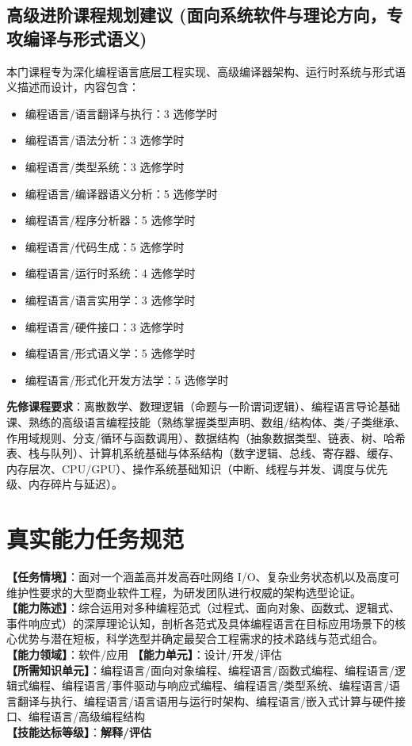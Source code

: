 \subsection{高级进阶课程规划建议 (面向系统软件与理论方向，专攻编译与形式语义)}
本门课程专为深化编程语言底层工程实现、高级编译器架构、运行时系统与形式语义描述而设计，内容包含：
\begin{itemize}
    \item 编程语言/语言翻译与执行：3 选修学时
    \item 编程语言/语法分析：3 选修学时
    \item 编程语言/类型系统：3 选修学时
    \item 编程语言/编译器语义分析：5 选修学时
    \item 编程语言/程序分析器：5 选修学时
    \item 编程语言/代码生成：5 选修学时
    \item 编程语言/运行时系统：4 选修学时
    \item 编程语言/语言实用学：3 选修学时
    \item 编程语言/硬件接口：3 选修学时
    \item 编程语言/形式语义学：5 选修学时
    \item 编程语言/形式化开发方法学：5 选修学时
\end{itemize}
\textbf{先修课程要求}：离散数学、数理逻辑（命题与一阶谓词逻辑）、编程语言导论基础课、熟练的高级语言编程技能（熟练掌握类型声明、数组/结构体、类/子类继承、作用域规则、分支/循环与函数调用）、数据结构（抽象数据类型、链表、树、哈希表、栈与队列）、计算机系统基础与体系结构（数字逻辑、总线、寄存器、缓存、内存层次、CPU/GPU）、操作系统基础知识（中断、线程与并发、调度与优先级、内存碎片与延迟）。

\section{真实能力任务规范}

\begin{taskbox}[任务 1：为特定工程应用科学选型适宜的编程语言与编程范式]
\textbf{【任务情境】}：面对一个涵盖高并发高吞吐网络 I/O、复杂业务状态机以及高度可维护性要求的大型商业软件工程，为研发团队进行权威的架构选型论证。\\
\textbf{【能力陈述】}：综合运用对多种编程范式（过程式、面向对象、函数式、逻辑式、事件响应式）的深厚理论认知，剖析各范式及具体编程语言在目标应用场景下的核心优势与潜在短板，科学选型并确定最契合工程需求的技术路线与范式组合。\\
\textbf{【能力领域】}：软件/应用 \quad \textbf{【能力单元】}：设计/开发/评估\\
\textbf{【所需知识单元】}：编程语言/面向对象编程、编程语言/函数式编程、编程语言/逻辑式编程、编程语言/事件驱动与响应式编程、编程语言/类型系统、编程语言/语言翻译与执行、编程语言/语言语用与运行时架构、编程语言/嵌入式计算与硬件接口、编程语言/高级编程结构\\
\textbf{【技能达标等级】}：\textbf{解释/评估}
\end{taskbox}

